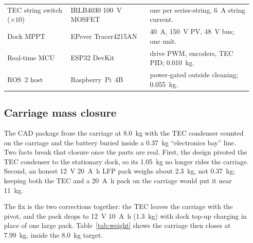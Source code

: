 \documentclass[11pt,a4paper]{article}
\begin{document}
\begin{table}[H]
\begin{tabular}{p{3.1cm} p{4.4cm} p{5.6cm}}
TEC string switch ($\times10$) & IRLB4030 \SI{100}{\volt} MOSFET
  \cite{irlb4030ds} & one per series-string, \SI{6}{\ampere} string current. \\
Dock MPPT & EPever Tracer4215AN \cite{epever2023tracer42}
  & \SI{40}{\ampere}, \SI{150}{\volt} PV, \SI{48}{\volt} bus; one unit. \\
Real-time MCU & ESP32 DevKit \cite{esp32ds}
  & drive PWM, encoders, TEC PID; \SI{0.010}{\kilo\gram}. \\
ROS~2 host & Raspberry~Pi~4B \cite{rpi2021brief}
  & power-gated outside cleaning; \SI{0.055}{\kilo\gram}. \\
\bottomrule
\end{tabular}
\end{table}

\subsection{Carriage mass closure}

The CAD package froze the carriage at \SI{8.0}{\kilo\gram} with the TEC condenser
counted on the carriage and the battery buried inside a \SI{0.37}{\kilo\gram}
``electronics bay'' line. Two facts break that closure once the parts are
real. First, the design pivoted the TEC condenser to the stationary dock, so its
\SI{1.05}{\kilo\gram} no longer rides the carriage. Second, an honest
\SI{12}{\volt} \SI{20}{\ampere\hour} LFP pack weighs about
\SI{2.3}{\kilo\gram}, not \SI{0.37}{\kilo\gram}; keeping both the TEC and a
\SI{20}{\ampere\hour} pack on the carriage would put it near \SI{11}{\kilo\gram}.

The fix is the two corrections together: the TEC leaves the carriage with the
pivot, and the pack drops to \SI{12}{\volt} \SI{10}{\ampere\hour}
(\SI{1.3}{\kilo\gram}) with dock top-up charging in place of one large pack.
Table~\ref{tab:weight} shows the carriage then closes at
\SI{7.99}{\kilo\gram}, inside the \SI{8.0}{\kilo\gram} target.
\end{document}
